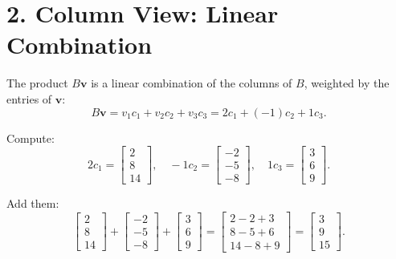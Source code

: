 \documentclass[11pt]{article}
\begin{document}
\section*{2. Column View: Linear Combination}

The product $ B\mathbf{v} $ is a linear combination of the columns of $ B $, weighted by the entries of $ \mathbf{v} $:
\[
B\mathbf{v} = v_1 c_1 + v_2 c_2 + v_3 c_3 = 2 c_1 + (-1) c_2 + 1 c_3.
\]

Compute:
\[
2 c_1 = \begin{bmatrix} 2 \\ 8 \\ 14 \end{bmatrix}, \quad
-1 c_2 = \begin{bmatrix} -2 \\ -5 \\ -8 \end{bmatrix}, \quad
1 c_3 = \begin{bmatrix} 3 \\ 6 \\ 9 \end{bmatrix}.
\]

Add them:
\[
\begin{bmatrix} 2 \\ 8 \\ 14 \end{bmatrix}
+
\begin{bmatrix} -2 \\ -5 \\ -8 \end{bmatrix}
+
\begin{bmatrix} 3 \\ 6 \\ 9 \end{bmatrix}
=
\begin{bmatrix}
2 - 2 + 3 \\
8 - 5 + 6 \\
14 - 8 + 9
\end{bmatrix}
=
\begin{bmatrix}
3 \\ 9 \\ 15
\end{bmatrix}.
\]
\end{document}
